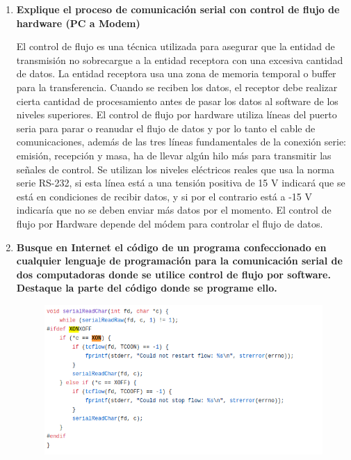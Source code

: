 \documentclass[a4paper,12pt]{article}
\begin{document}
 \begin{enumerate} 
  \item \textbf{Explique el proceso de comunicación serial con control de flujo de hardware (PC a Modem)}
  
  El control de flujo es una técnica utilizada para asegurar que la entidad de transmisión no sobrecargue a la entidad receptora con una excesiva cantidad de datos.
  La entidad receptora usa una zona de memoria temporal o buffer para la transferencia. Cuando se reciben los datos, el receptor debe realizar cierta cantidad de 
  procesamiento antes de pasar los datos al software de los niveles superiores. El control de flujo por hardware utiliza líneas del puerto seria para parar o reanudar el flujo de datos y
  por lo tanto el cable de comunicaciones, además de las tres líneas fundamentales de la conexión serie: emisión, recepción y masa, ha de llevar algún hilo más para transmitir las señales de control.
  Se utilizan los niveles eléctricos reales que usa la norma serie RS-232, si esta línea está a una tensión positiva de 15 V indicará que se está en condiciones de recibir datos, y si por el contrario está a -15 V indicaría que 
  no se deben enviar más datos por el momento. El control de flujo por Hardware depende del módem para controlar el flujo de datos.
  
  \item \textbf{Busque en Internet el código de un programa confeccionado en cualquier lenguaje de programación para la comunicación serial de dos computadoras donde se utilice control de flujo por software. Destaque la parte del código donde se programe ello.}
  
  \begin{figure}[H]
   \centering
   \includegraphics[scale = 0.7]{9.png}
  \end{figure}


\end{enumerate}
\end{document}
